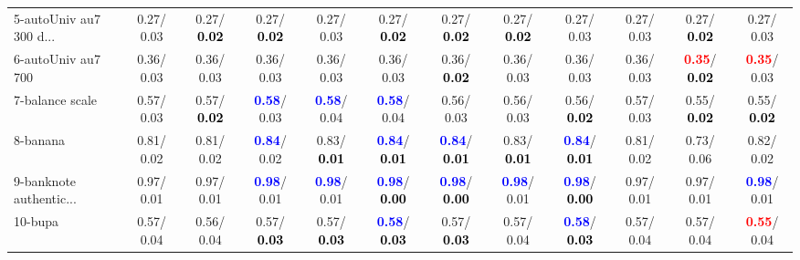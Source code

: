 \begin{table}[h]
\begin{center}
{\begin{tabular}{lc|c|c|c|c|c|c|c|c|c|c}
5-autoUniv au7 300 d... &   0.27/  0.03 &   0.27/\textcolor{black}{\textbf{  0.02}} &   0.27/\textcolor{black}{\textbf{  0.02}} &   0.27/  0.03 &   0.27/\textcolor{black}{\textbf{  0.02}} &   0.27/\textcolor{black}{\textbf{  0.02}} &   0.27/\textcolor{black}{\textbf{  0.02}} &   0.27/  0.03 &   0.27/  0.03 &   0.27/\textcolor{black}{\textbf{  0.02}} &   0.27/  0.03 \\
6-autoUniv au7 700 &   0.36/  0.03 &   0.36/  0.03 &   0.36/  0.03 &   0.36/  0.03 &   0.36/  0.03 &   0.36/\textcolor{black}{\textbf{  0.02}} &   0.36/  0.03 &   0.36/  0.03 &   0.36/  0.03 & \textcolor{red}{\textbf{  0.35}}/\textcolor{black}{\textbf{  0.02}} & \textcolor{red}{\textbf{  0.35}}/  0.03 \\
7-balance scale &   0.57/  0.03 &   0.57/\textcolor{black}{\textbf{  0.02}} & \textcolor{blue}{\textbf{  0.58}}/  0.03 & \textcolor{blue}{\textbf{  0.58}}/  0.04 & \textcolor{blue}{\textbf{  0.58}}/  0.04 &   0.56/  0.03 &   0.56/  0.03 &   0.56/\textcolor{black}{\textbf{  0.02}} &   0.57/  0.03 &   0.55/\textcolor{black}{\textbf{  0.02}} &   0.55/\textcolor{black}{\textbf{  0.02}} \\ \hline
8-banana &   0.81/  0.02 &   0.81/  0.02 & \textcolor{blue}{\textbf{  0.84}}/  0.02 &   0.83/\textcolor{black}{\textbf{  0.01}} & \textcolor{blue}{\textbf{  0.84}}/\textcolor{black}{\textbf{  0.01}} & \textcolor{blue}{\textbf{  0.84}}/\textcolor{black}{\textbf{  0.01}} &   0.83/\textcolor{black}{\textbf{  0.01}} & \textcolor{blue}{\textbf{  0.84}}/\textcolor{black}{\textbf{  0.01}} &   0.81/  0.02 &   0.73/  0.06 &   0.82/  0.02 \\
9-banknote authentic... &   0.97/  0.01 &   0.97/  0.01 & \textcolor{blue}{\textbf{  0.98}}/  0.01 & \textcolor{blue}{\textbf{  0.98}}/  0.01 & \textcolor{blue}{\textbf{  0.98}}/\textcolor{black}{\textbf{  0.00}} & \textcolor{blue}{\textbf{  0.98}}/\textcolor{black}{\textbf{  0.00}} & \textcolor{blue}{\textbf{  0.98}}/  0.01 & \textcolor{blue}{\textbf{  0.98}}/\textcolor{black}{\textbf{  0.00}} &   0.97/  0.01 &   0.97/  0.01 & \textcolor{blue}{\textbf{  0.98}}/  0.01 \\
10-bupa &   0.57/  0.04 &   0.56/  0.04 &   0.57/\textcolor{black}{\textbf{  0.03}} &   0.57/\textcolor{black}{\textbf{  0.03}} & \textcolor{blue}{\textbf{  0.58}}/\textcolor{black}{\textbf{  0.03}} &   0.57/\textcolor{black}{\textbf{  0.03}} &   0.57/  0.04 & \textcolor{blue}{\textbf{  0.58}}/\textcolor{black}{\textbf{  0.03}} &   0.57/  0.04 &   0.57/  0.04 & \textcolor{red}{\textbf{  0.55}}/  0.04 \\

\end{tabular}}
\end{center}
\end{table}
